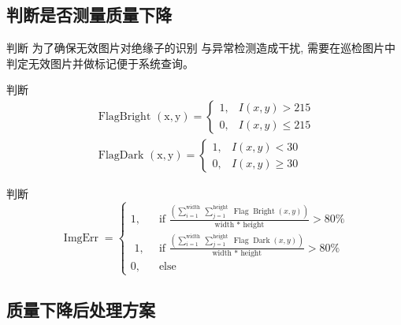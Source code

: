 \documentclass{beamer}
\begin{document}
\subsection{判断是否测量质量下降}
\begin{frame}
  \begin{block}{判断}
为了确保无效图片对绝缘子的识别
与异常检测造成干扰, 需要在巡检图片中判定无效图片并做标记便于系统查询。
  \end{block}
\end{frame}
\begin{frame}
  \begin{block}{判断}
  \begin{equation}
    \label{eq:06}
\begin{array}{l}
\text { FlagBright }(\mathrm{x}, \mathrm{y})=\left\{\begin{array}{ll}
1, & I(x, y)>215 \\
0, & I(x, y) \leq 215
\end{array}\right. \\
\text { FlagDark }(\mathrm{x}, \mathrm{y})=\left\{\begin{array}{ll}
1, & I(x, y)<30 \\
0, & I(x, y) \geq 30
\end{array}\right.
\end{array}
\end{equation}
  \end{block}
\end{frame}

\begin{frame}
  \begin{block}{判断}
\begin{equation}
  \label{eq:07}
\operatorname{ImgErr}=\left\{\begin{array}{cc}
1, & \text { if } \frac{\left(\sum_{i=1}^{\text {width }} \sum_{j=1}^{\text {height }} \operatorname{Flag} \operatorname{Bright}(x, y)\right)}{\text { width * height }}>80 \% \\
\text { 1, } & \text { if } \frac{\left(\sum_{i=1}^{\text {width }} \sum_{j=1}^{\text {height }} \operatorname{Flag} \operatorname{Dark}(x, y)\right)}{\text { width * height }}>80 \% \\
0, & \text { else }
\end{array}\right.
\end{equation}

  \end{block}
\end{frame}
\subsection{质量下降后处理方案}
\end{document}
